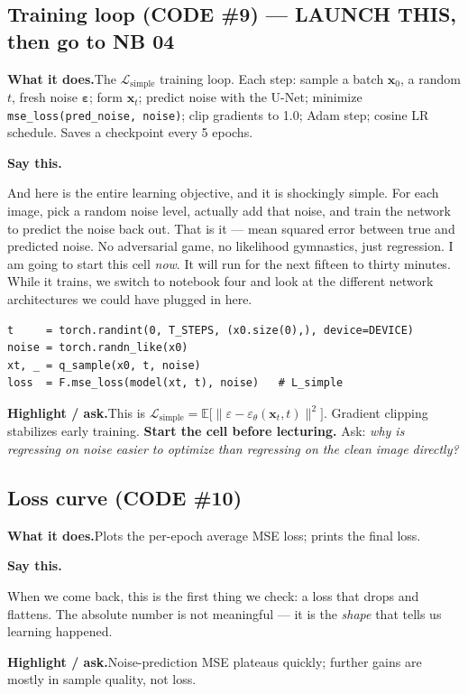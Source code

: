 \documentclass[11pt]{article}
\newenvironment{saythis}{%
  \par\smallskip\noindent
  \begin{list}{}{%
    \setlength{\leftmargin}{1.2em}%
    \setlength{\rightmargin}{0.5em}%
    \setlength{\topsep}{2pt}%
  }\item\relax
  \color{sayrule}\textbf{Say this.}\hspace{0.4em}\color{black}\itshape
}{%
  \end{list}\par\smallskip
}
\newcommand{\highlight}[1]{\par\smallskip\noindent\textcolor{hlcolor}{\textbf{Highlight / ask.}}\hspace{0.4em}#1\par\smallskip}
\newcommand{\whatdoes}[1]{\par\noindent\textbf{What it does.}\hspace{0.4em}#1\par}
\begin{document}
\subsection{Training loop (CODE \#9) --- LAUNCH THIS, then go to NB 04}
\whatdoes{The $\mathcal{L}_{\text{simple}}$ training loop. Each step: sample a batch $\mathbf{x}_0$,
a random $t$, fresh noise $\boldsymbol\varepsilon$; form $\mathbf{x}_t$; predict noise with the U-Net;
minimize \texttt{mse\_loss(pred\_noise, noise)}; clip gradients to 1.0; Adam step; cosine LR schedule.
Saves a checkpoint every 5 epochs.}
\begin{saythis}
And here is the entire learning objective, and it is shockingly simple. For each image, pick a random
noise level, actually add that noise, and train the network to predict the noise back out. That is it
--- mean squared error between true and predicted noise. No adversarial game, no likelihood gymnastics,
just regression. I am going to start this cell \emph{now}. It will run for the next fifteen to thirty
minutes. While it trains, we switch to notebook four and look at the different network architectures we
could have plugged in here.
\end{saythis}
\begin{lstlisting}
t     = torch.randint(0, T_STEPS, (x0.size(0),), device=DEVICE)
noise = torch.randn_like(x0)
xt, _ = q_sample(x0, t, noise)
loss  = F.mse_loss(model(xt, t), noise)   # L_simple
\end{lstlisting}
\highlight{This is $\mathcal{L}_{\text{simple}} = \mathbb{E}\big[\|\varepsilon - \varepsilon_\theta(\mathbf{x}_t,t)\|^2\big]$.
Gradient clipping stabilizes early training. \textbf{Start the cell before lecturing.} Ask:
\emph{why is regressing on noise easier to optimize than regressing on the clean image directly?}}

\subsection{Loss curve (CODE \#10)}
\whatdoes{Plots the per-epoch average MSE loss; prints the final loss.}
\begin{saythis}
When we come back, this is the first thing we check: a loss that drops and flattens. The absolute number
is not meaningful --- it is the \emph{shape} that tells us learning happened.
\end{saythis}
\highlight{Noise-prediction MSE plateaus quickly; further gains are mostly in sample quality, not loss.}
\end{document}
